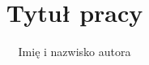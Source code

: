 \documentclass[magister,druk]{dyplom}
\author{Imię i nazwisko autora}
\title{Tytuł pracy}
\begin{document}
\maketitle



\tableofcontents










\listoffigures
\listoflistings
\listoftables

\appendixpage
\appendix

\end{document}
